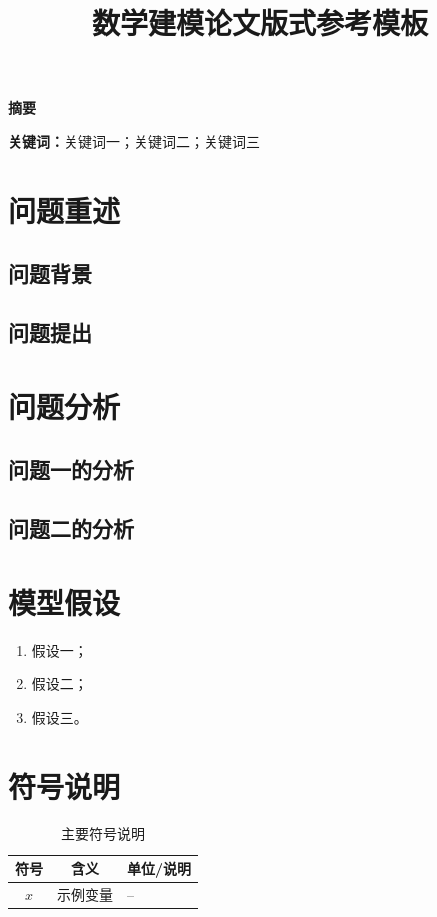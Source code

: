 \documentclass[12pt,a4paper]{article}
\title{\textbf{数学建模论文版式参考模板}}
\author{}
\date{}
\begin{document}
\maketitle
\thispagestyle{empty}

\begin{center}
{\Large\textbf{摘要}}
\end{center}


\textbf{关键词：}关键词一；关键词二；关键词三

\newpage
\setcounter{page}{1}
\pagestyle{fancy}

\section{问题重述}
\subsection{问题背景}
\subsection{问题提出}

\section{问题分析}
\subsection{问题一的分析}
\subsection{问题二的分析}

\section{模型假设}
\begin{enumerate}[leftmargin=2em]
  \item 假设一；
  \item 假设二；
  \item 假设三。
\end{enumerate}

\section{符号说明}
\begin{table}[H]
\centering
\caption{主要符号说明}
\begin{tabular}{ccl}
\toprule
\textbf{符号} & \textbf{含义} & \textbf{单位/说明}\\
\midrule
$x$ & 示例变量 & --\\
\bottomrule
\end{tabular}
\end{table}
\end{document}
